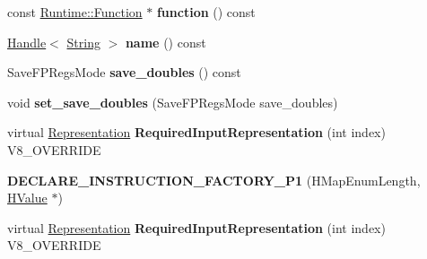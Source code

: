 \begin{DoxyCompactItemize}
\item 
\hypertarget{classv8_1_1internal_1_1_v8___f_i_n_a_l_acc0e2639930385ffe8917bc61bbb23f2}{}const \hyperlink{structv8_1_1internal_1_1_runtime_1_1_function}{Runtime\+::\+Function} $\ast$ {\bfseries function} () const \label{classv8_1_1internal_1_1_v8___f_i_n_a_l_acc0e2639930385ffe8917bc61bbb23f2}

\item 
\hypertarget{classv8_1_1internal_1_1_v8___f_i_n_a_l_ae093884f144601c733c3c49b3af199b4}{}\hyperlink{classv8_1_1internal_1_1_handle}{Handle}$<$ \hyperlink{classv8_1_1internal_1_1_string}{String} $>$ {\bfseries name} () const \label{classv8_1_1internal_1_1_v8___f_i_n_a_l_ae093884f144601c733c3c49b3af199b4}

\item 
\hypertarget{classv8_1_1internal_1_1_v8___f_i_n_a_l_a0c5df6b78c4e9300f8bcf0f107efa51e}{}Save\+F\+P\+Regs\+Mode {\bfseries save\+\_\+doubles} () const \label{classv8_1_1internal_1_1_v8___f_i_n_a_l_a0c5df6b78c4e9300f8bcf0f107efa51e}

\item 
\hypertarget{classv8_1_1internal_1_1_v8___f_i_n_a_l_a7bbda7e5620557c4a6243e72329a575c}{}void {\bfseries set\+\_\+save\+\_\+doubles} (Save\+F\+P\+Regs\+Mode save\+\_\+doubles)\label{classv8_1_1internal_1_1_v8___f_i_n_a_l_a7bbda7e5620557c4a6243e72329a575c}

\item 
\hypertarget{classv8_1_1internal_1_1_v8___f_i_n_a_l_a6c6d1f37f40b113d8f4062f1ffff7215}{}virtual \hyperlink{classv8_1_1internal_1_1_representation}{Representation} {\bfseries Required\+Input\+Representation} (int index) V8\+\_\+\+O\+V\+E\+R\+R\+I\+D\+E\label{classv8_1_1internal_1_1_v8___f_i_n_a_l_a6c6d1f37f40b113d8f4062f1ffff7215}

\item 
\hypertarget{classv8_1_1internal_1_1_v8___f_i_n_a_l_a91f26b3d1d94ede9f33c49e93491b048}{}{\bfseries D\+E\+C\+L\+A\+R\+E\+\_\+\+I\+N\+S\+T\+R\+U\+C\+T\+I\+O\+N\+\_\+\+F\+A\+C\+T\+O\+R\+Y\+\_\+\+P1} (H\+Map\+Enum\+Length, \hyperlink{classv8_1_1internal_1_1_h_value}{H\+Value} $\ast$)\label{classv8_1_1internal_1_1_v8___f_i_n_a_l_a91f26b3d1d94ede9f33c49e93491b048}

\item 
\hypertarget{classv8_1_1internal_1_1_v8___f_i_n_a_l_a6c6d1f37f40b113d8f4062f1ffff7215}{}virtual \hyperlink{classv8_1_1internal_1_1_representation}{Representation} {\bfseries Required\+Input\+Representation} (int index) V8\+\_\+\+O\+V\+E\+R\+R\+I\+D\+E\label{classv8_1_1internal_1_1_v8___f_i_n_a_l_a6c6d1f37f40b113d8f4062f1ffff7215}


\end{DoxyCompactItemize}

